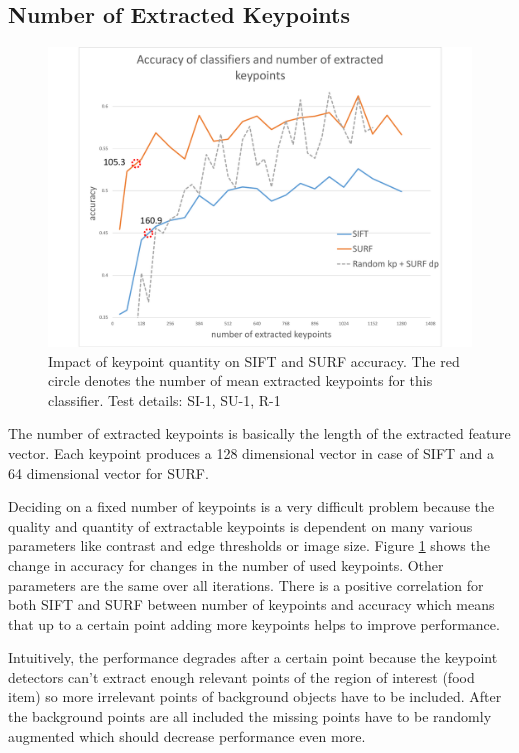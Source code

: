 	\subsection{Number of Extracted Keypoints}
	\begin{figure}[htb]
		\centering
		\includegraphics[scale=0.4]{figures/results_keypoints}		
		\caption{Impact of keypoint quantity on SIFT and SURF accuracy. The red circle denotes the number of mean extracted keypoints for this classifier. Test details: SI-1, SU-1, R-1}
		\label{fig:resultsKeypoints}
	\end{figure}
	The number of extracted keypoints is basically the length of the extracted feature vector. Each keypoint produces a 128 dimensional vector in case of SIFT and a 64 dimensional vector for SURF. 
	
	Deciding on a fixed number of keypoints is a very difficult problem because the quality and quantity of extractable keypoints is dependent on many various parameters like contrast and edge thresholds or image size. Figure \ref{fig:resultsKeypoints} shows the change in accuracy for changes in the number of used keypoints. Other parameters are the same over all iterations. There is a positive correlation for both SIFT and SURF between number of keypoints and accuracy which means that up to a certain point adding more keypoints helps to improve performance. 
	
	Intuitively, the performance degrades after a certain point because the keypoint detectors can't extract enough relevant points of the region of interest {(food item)} so more irrelevant points of background objects have to be included. After the background points are all included the missing points have to be randomly augmented which should decrease performance even more.
	
